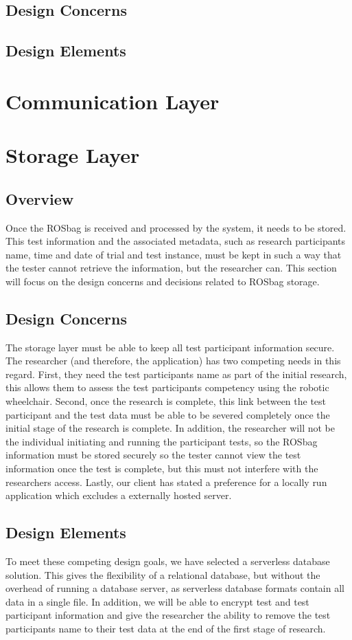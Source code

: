 \documentclass[onecolumn, draftclsnofoot,10pt, compsoc]{IEEEtran}
\begin{document}
\subsection{Design Concerns}

\subsection{Design Elements}

\section{Communication Layer}

\section{Storage Layer}
\subsection{Overview}
Once the ROSbag is received and processed by the system, it needs to be stored. This test information and the associated metadata, such as research participants name, time and date of trial and test instance, must be kept in such a way that the tester cannot retrieve the information, but the researcher can. This section will focus on the design concerns and decisions related to ROSbag storage. 
\subsection{Design Concerns}
The storage layer must be able to keep all test participant information secure. The researcher (and therefore, the application) has two competing needs in this regard. First, they need the test participants name as part of the initial research, this allows them to assess the test participants competency using the robotic wheelchair. Second, once the research is complete, this link between the test participant and the test data must be able to be severed completely once the initial stage of the research is complete. In addition, the researcher will not be the individual initiating and running the participant tests, so the ROSbag information must be stored securely so the tester cannot view the test information once the test is complete, but this must not interfere with the researchers access. Lastly, our client has stated a preference for a locally run application which excludes a externally hosted server.
\subsection{Design Elements}
To meet these competing design goals, we have selected a serverless database solution. This gives the flexibility of a relational database, but without the overhead of running a database server, as serverless database formats contain all data in a single file. In addition, we will be able to encrypt test and test participant information and give the researcher the ability to remove the test participants name to their test data at the end of the first stage of research. 
\end{document}
